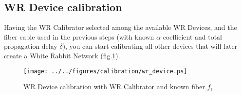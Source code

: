 \subsection{WR Device calibration} 
\label{subsec:devices}

Having the WR Calibrator selected among the available WR Devices, and the fiber
cable used in the previous steps (with known $\alpha$ coefficient and total
propagation delay $\delta$), you can start calibrating all other devices that
will later create a White Rabbit Network (fig.\ref{fig:devices}). 

\begin{figure}[ht]
	\begin{center}
		\texttt{[image: ../../figures/calibration/wr\_device.ps]}
		\caption{WR Device calibration with WR Calibrator and known
		fiber $f_1$}
		\label{fig:devices}
	\end{center}
\end{figure}


